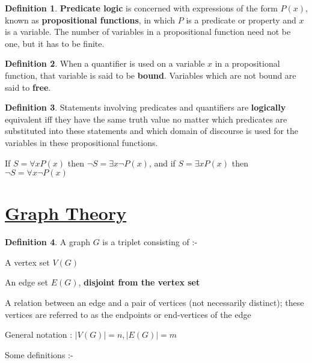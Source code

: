 \documentclass{article}
\theoremstyle{definition}
\newtheorem*{defi}{Definition}
\theoremstyle{definition}
\theoremstyle{named}
\begin{document}
\begin{defi}
    \textbf{Predicate logic} is concerned with
expressions of the form $P(x)$, known as
\textbf{propositional functions}, in which $P$ is a predicate or
property and $x$ is a variable. The number of variables
in a propositional function need not be one, but it
has to be finite.
\end{defi}

\begin{defi}
    When a quantifier is used on a variable
$x$ in a propositional function, that variable is said to
be \textbf{bound}. Variables which are not bound are said to \textbf{free}.
\end{defi}
\begin{defi}
    Statements involving predicates and
quantifiers are \textbf{logically} equivalent iff they have the
same truth value no matter which predicates are
substituted into these statements and which domain
of discourse is used for the variables in these
propositional functions.
\end{defi}

    If $S = \forall x P(x)$ then $\neg S = \exists x \neg P(x)$,  and 
if $S = \exists x P(x)$ then $\neg S = \forall x \neg P(x)$

\section{\underline{Graph Theory}}

\begin{defi}
    A graph $G$ is a triplet consisting of :-
    \begin{citemize}
        \item A vertex set $V(G)$
        \item An edge set $E(G)$, \textbf{disjoint from the vertex set}
        \item A relation between an edge and a pair of vertices (not
necessarily distinct); these vertices are referred to as the
endpoints or end-vertices of the edge
        \item General notation : $|V(G)| = n, |E(G)| = m$
    \end{citemize}
\end{defi}

Some definitions :-
\end{document}
